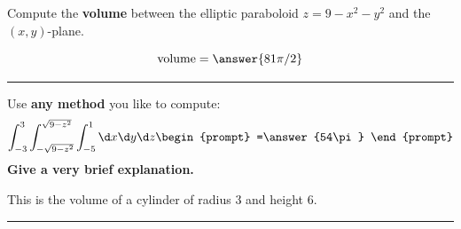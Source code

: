 \documentclass{ximera}
\begin{document}
\begin{problem}
  Compute the \textbf{volume} between the elliptic paraboloid $z = 9-x^2-y^2$
  and the $(x,y)$-plane.
  \begin{prompt}
    \[
    \text{volume} = \answer{81\pi/2}
    \]
  \end{prompt}
\end{problem}

\vfill
\hrule
\begin{problem}
  Use \textbf{any method} you like to compute:
  \[
  \int_{-3}^{3} \int_{-\sqrt{9-z^2}}^{\sqrt{9-z^2}}\int_{-5}^1 \d x\d y \d z
  \begin{prompt}
  =\answer{54\pi}  
  \end{prompt}
  \]
  \textbf{Give a very brief explanation.}
  \begin{feedback}[correct]
    This is the volume of a cylinder of radius $3$ and height $6$.
  \end{feedback}
  \vfill
\end{problem}
\hrule
\end{document}
